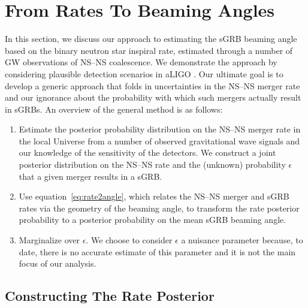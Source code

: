 \documentclass[twocolumn,nofootinbib]{revtex4-1}
\newcommand{\BNS}{\ac{NS}--\ac{NS}\xspace}
\newcommand{\ish}[1]{{\color{blue}{#1}}}
\begin{document}
\section{From Rates To Beaming Angles}

In this section, we discuss our approach to estimating the \ac{sGRB} beaming angle based on the binary neutron star inspiral rate, estimated through a number of \ac{GW} observations of \BNS coalescence.
We demonstrate the approach by considering plausible detection scenarios in aLIGO \ish{detailed in [ref]}.
Our ultimate goal is to develop a generic approach that folds in uncertainties in the \BNS merger rate and our ignorance about the probability with which such mergers actually result in \acp{sGRB}.
%
An overview of the general method is as follows:

\begin{enumerate}
    \item Estimate the posterior probability distribution on the \BNS merger rate
    in the local Universe from a number of observed gravitational wave signals
    and our knowledge of the sensitivity of the detectors.  We construct a joint
    posterior distribution on the \BNS rate and the (unknown) probability
    $\epsilon$ that a given merger results in a \ac{sGRB}.
\item Use equation~\ref{eq:rate2angle}, which relates the \BNS merger and
    \ac{sGRB} rates via the geometry of the beaming angle, to transform the rate
    posterior probability to a posterior probability on the mean \ac{sGRB}
    beaming angle.
\item Marginalize over $\epsilon$. We choose to consider $\epsilon$ a nuisance
    parameter because, to date, there is no accurate estimate of this parameter
    and it is not the main focus of our analysis. 
\end{enumerate}


\subsection{Constructing The Rate Posterior}
\label{sec:rate_posterior}
%
\end{document}
